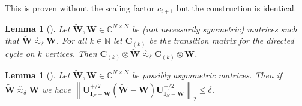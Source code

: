 \documentclass[11pt]{article}
\numberwithin{equation}{section}
\newtheorem{lemma}[theorem]{Lemma}
\theoremstyle{definition}
\theoremstyle{plain}
\newcommand{\C}{\mathbb C}
\newcommand{\N}{\mathbb N}
\newcommand{\mC}{\mathbf{C}}
\newcommand{\mU}{\mathbf{U}}
\newcommand{\mW}{\mathbf{W}}
\newcommand{\I}{\mathbf{I}}
\newcommand{\mtW}{\widetilde{\mathbf{W}}}
\newcommand{\sym}[1][ ]{\mU_{#1}}
\newcommand{\lbar}{\left\|}
\newcommand{\rbar}{\right\|}
\newcommand{\uc}{\stackrel{\circ}{\approx}}
\begin{document}
This is proven without the scaling factor $c_{i+1}$ but the construction is identical.

\begin{lemma}[{\cite[Corollary 4.6]{AhmadinejadKeMuPeSiVa19}}]  %
\label{app:ucCycle}
Let $\mtW, \mW \in \C^{N\times N}$ be
%
(not necessarily symmetric)  %
matrices such that $\mtW \uc_\delta \mW$. For all $k \in \N$ let $\mC_{(k)}$ be the transition matrix for the directed cycle on $k$ vertices. Then $\mC_{(k)}\otimes\mtW \uc_\delta \mC_{(k)} \otimes \mW$.
\end{lemma}
\begin{lemma}[{\cite[Lemma 3.8]{AhmadinejadKeMuPeSiVa19}}] %
\label{app:ucLap}
Let $\mtW, \mW \in \C^{N\times N}$ be possibly asymmetric matrices. Then if $\mtW \uc_\delta \mW$ we have $\lbar\sym[\I_N-\mW]^{+/2}(\mtW-\mW)\sym[\I_N-\mW]^{+/2}\rbar_2\leq \delta$.
\end{lemma}
\end{document}

